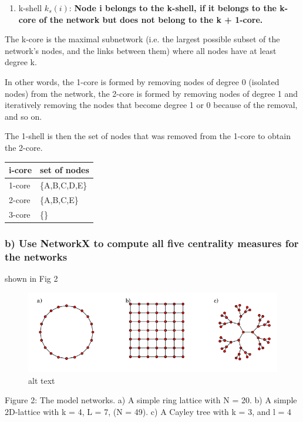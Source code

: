 \documentclass[11pt]{article}
\makeatletter
\def\maxwidth{\ifdim\Gin@nat@width>\linewidth\linewidth
    \else\Gin@nat@width\fi}
\let\Oldincludegraphics\includegraphics
\renewcommand{\includegraphics}[1]{\Oldincludegraphics[width=.8\maxwidth]{#1}}
\providecommand{\tightlist}{%
      \setlength{\itemsep}{0pt}\setlength{\parskip}{0pt}}
\makeatother
\begin{document}
    \begin{enumerate}
\def\labelenumi{\arabic{enumi}.}
\setcounter{enumi}{3}
\tightlist
\item
  k-shell \(k_s(i)\): \textbf{Node i belongs to the k-shell, if it
  belongs to the k-core of the network but does not belong to the k +
  1-core.}
\end{enumerate}

The k-core is the maximal subnetwork (i.e. the largest possible subset
of the network's nodes, and the links between them) where all nodes have
at least degree k.

In other words, the 1-core is formed by removing nodes of degree 0
(isolated nodes) from the network, the 2-core is formed by removing
nodes of degree 1 and iteratively removing the nodes that become degree
1 or 0 because of the removal, and so on.

The 1-shell is then the set of nodes that was removed from the 1-core to
obtain the 2-core.

\begin{longtable}[]{@{}ll@{}}
\toprule
i-core & set of nodes\tabularnewline
\midrule
\endhead
1-core & \{A,B,C,D,E\}\tabularnewline
2-core & \{A,B,C,E\}\tabularnewline
3-core & \{\}\tabularnewline
\bottomrule
\end{longtable}

    \subsubsection{b) Use NetworkX to compute all five centrality measures
for the
networks}\label{b-use-networkx-to-compute-all-five-centrality-measures-for-the-networks}

shown in Fig 2

\begin{figure}
\centering
\includegraphics{../assets/fig2.png}
\caption{alt text}
\end{figure}

Figure 2: The model networks. a) A simple ring lattice with N = 20. b) A
simple 2D-lattice with k = 4, L = 7, (N = 49). c) A Cayley tree with k =
3, and l = 4
\end{document}
